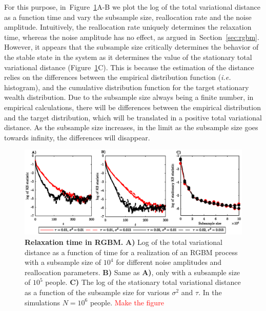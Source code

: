 \documentclass[11pt]{article}
\newcommand{\Sref}[1]{Section~\ref{sec:#1}}
\newcommand{\ie}{{\it i.e.}\xspace}
\newcommand{\Fref}[1]{Figure~\ref{fig:#1}}
\numberwithin{equation}{section}
\begin{document}
For this purpose, in~\Fref{rgbm-mixing-time}A-B we plot the log of the total variational distance as a function time and vary the subsample size, reallocation rate and the noise amplitude. Intuitively, the reallocation rate uniquely determines the relaxation time, whereas the noise amplitude has no effect, as argued in~\Sref{rgbm}. However, it appears that the subsample size critically determines the behavior of the stable state in the system as it determines the value of the stationary total variational distance (\Fref{rgbm-mixing-time}C). This is because the estimation of the distance relies on the differences between the empirical distribution function (\ie histogram), and the cumulative distribution function for the target stationary wealth distribution. Due to the subsample size always being a finite number, in empirical calculations, there will be differences between the empirical distribution and the target distribution, which will be translated in a positive total variational distance. As the subsample size increases, in the limit as the subsample size goes towards infinity, the differences will disappear.

\begin{figure}[!htb]
\centering
\includegraphics[width=1.0\textwidth]{figs/fig_mixing_time_rgbm.eps}
\caption{\textbf{Relaxation time in RGBM.} \textbf{A)} Log of the total variational distance as a function of time for a realization of an RGBM process with a subsample size of $10^4$ for different noise amplitudes and reallocation parameters. \textbf{B)} Same as \textbf{A)}, only with a subsample size of $10^5$ people. \textbf{C)} The log of the stationary total variational distance as a function of the subsample size for various $\sigma^2$ and $\tau$. In the simulations $N = 10^6$ people. \textcolor{red}{Make the figure} \label{fig:rgbm-mixing-time}}
\end{figure}
\end{document}
